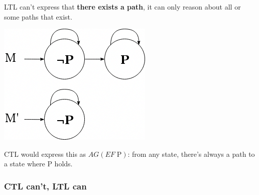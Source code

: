 \documentclass[a4paper, 11pt]{article}
\begin{document}
{{{\begin{minipage}[t]{0.7\textwidth}
            LTL can't express that \textbf{there exists a path}, it can only reason about all or some paths that exist.
            \end{minipage}
            \begin{minipage}[t]{0.25\textwidth}
            \vspace{-2pt}
            \includegraphics[width=\textwidth]{ltl-inexpressible.png}
            \end{minipage}

            CTL would express this as \(AG(EF\;\text{P})\): from any state, there's always a path to a state where P holds.
        }
        \subsubsection*{CTL can't, LTL can}
        {
        }
    }
}
\end{document}
